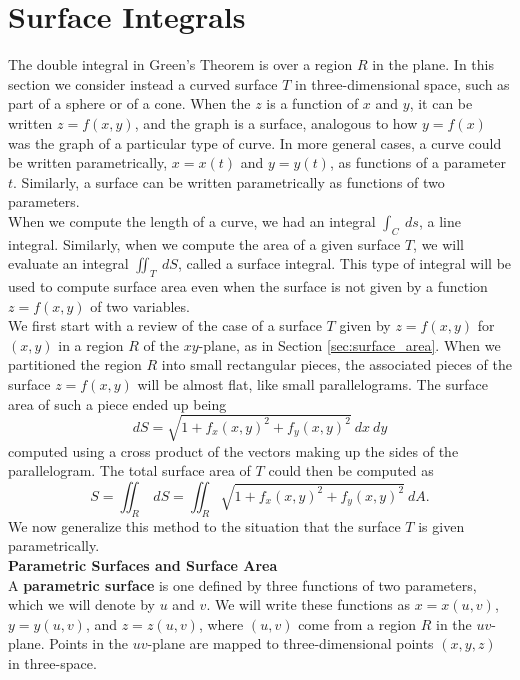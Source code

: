 \section{Surface Integrals}\label{sec:surface_integrals}

The double integral in Green's Theorem is over a region $R$ in the plane.  In this section we consider instead a curved surface $T$ in three-dimensional space, such as part of a sphere or of a cone. When the $z$ is a function of $x$ and $y$, it can be written $z = f(x,y)$, and the graph is a surface, analogous to how $y = f(x)$ was the graph of a particular type of curve.  In more general cases, a curve could be written parametrically, $x = x(t)$ and $y = y(t)$, as functions of a parameter $t$.  Similarly, a surface can be written parametrically as functions of two parameters.\\

When we compute the length of a curve, we had an integral $\int_C \: ds$, a line integral.  Similarly, when we compute the area of a given surface $T$, we will evaluate an integral $\iint_T \: dS$, called a surface integral. This type of integral will be used to compute surface area even when the surface is not given by a function $z = f(x,y)$ of two variables. \\

We first start with a review of the case of a surface $T$ given by $z = f(x,y)$ for $(x,y)$ in a region $R$ of the $xy$-plane, as in Section \ref{sec:surface_area}.  When we partitioned the region $R$ into small rectangular pieces, the associated pieces of the surface $z = f(x,y)$ will be almost flat, like small parallelograms. The surface area of such a piece ended up being
$$dS = \sqrt{1 + f_x(x,y)^2+f_y(x,y)^2} \: dx \: dy$$
computed using a cross product of the vectors making up the sides of the parallelogram. The total surface area of $T$ could then be computed as
$$S = \iint_R \: dS = \iint_R \sqrt{1 + f_x(x,y)^2+f_y(x,y)^2} \: dA.$$
We now generalize this method to the situation that the surface $T$ is given parametrically.\\

\noindent\textbf{\large Parametric Surfaces and Surface Area}\\

A \textbf{parametric surface} is one defined by three functions of two parameters, which we will denote by $u$ and $v$.  We will write these functions as $x = x(u,v)$, $y = y(u,v)$, and $z = z(u,v)$, where $(u,v)$ come from a region $R$ in the $uv$-plane.  Points in the $uv$-plane are mapped to three-dimensional points $(x,y,z)$ in three-space.\\

